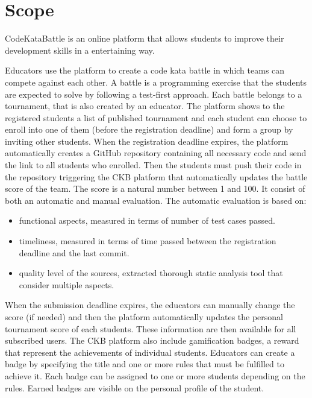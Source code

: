 \section{Scope}
CodeKataBattle is an online platform that allows students to improve their development skills in a entertaining way. 


Educators use the platform to create a code kata battle in which teams can compete against each other. A battle is a programming exercise that the students are expected to solve by following a test-first approach. Each battle belongs to a tournament, that is also created by an educator.
The platform shows to the registered students a list of published tournament and each student can choose to enroll into one of them (before the registration deadline) and form a group by inviting other students. \newline
When the registration deadline expires, the platform automatically creates a GitHub repository containing all necessary code and send the link to all students who enrolled. 
Then the students must push their code in the repository triggering the CKB platform that automatically updates the battle score of the team. \newline
The score is a natural number between 1 and 100. It consist of both an automatic and manual evaluation.  
The automatic evaluation is based on:

\begin{itemize}
    \item functional aspects, measured in terms of number of test cases passed.
    \item timeliness, measured in terms of time passed between the registration deadline and the last commit.
    \item quality level of the sources, extracted thorough static analysis tool that consider multiple aspects.
\end{itemize}

When the submission deadline expires, the educators can manually change the score (if needed) and then the platform automatically updates the personal tournament score of each students. These information are then available for all subscribed users. \newline
The CKB platform also include gamification badges, a reward that represent the achievements of individual students. Educators can create a badge by specifying the title and one or more rules that must be fulfilled to achieve it. Each badge can be assigned to one or more students depending on the rules. Earned badges are visible on the personal profile of the student.



